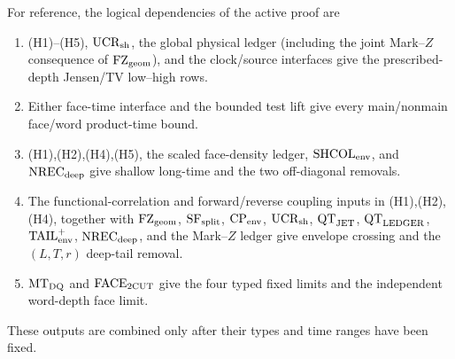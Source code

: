 \documentclass[11pt]{article}
\begin{document}
For reference, the logical dependencies of the active proof are
\begin{enumerate}[label=\textup{(D\arabic*)}]
\item \textup{(H1)--(H5)}, $\mathrm{UCR}_{\rm sh}$, the global physical
      ledger (including the joint Mark--$Z$ consequence of
      $\mathrm{FZ}_{\rm geom}$), and the clock/source interfaces give the
      prescribed-depth Jensen/TV low--high rows.
\item Either face-time interface and the bounded test lift give every
      main/nonmain face/word product-time bound.
\item \textup{(H1),(H2),(H4),(H5)}, the scaled face-density ledger,
      $\mathrm{SHCOL}_{\rm env}$, and $\mathrm{NREC}_{\rm deep}$ give
      shallow long-time and the two off-diagonal removals.
\item The functional-correlation and forward/reverse coupling inputs in
      \textup{(H1),(H2),(H4)}, together with
      $\mathrm{FZ}_{\rm geom}$, $\mathrm{SF}_{\rm split}$,
      $\mathrm{CP}_{\rm env}$, $\mathrm{UCR}_{\rm sh}$,
      $\mathrm{QT}_{\rm JET}$, $\mathrm{QT}_{\rm LEDGER}$,
      $\mathrm{TAIL}_{\rm env}^{+}$, $\mathrm{NREC}_{\rm deep}$, and the
      Mark--$Z$ ledger give envelope crossing and the $(L,T,r)$ deep-tail
      removal.
\item $\mathrm{MT}_{\rm DQ}$ and $\mathrm{FACE}_{\rm 2CUT}$ give the four
      typed fixed limits and the independent word-depth face limit.
\end{enumerate}
These outputs are combined only after their types and time ranges have been
fixed.
\end{document}
